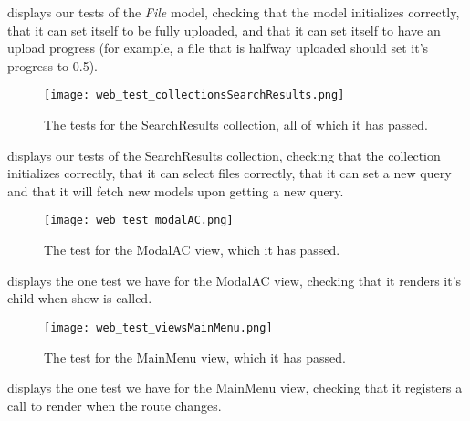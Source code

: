  displays our tests of the \textit{File} model, checking that the model initializes correctly, that it can set itself to be fully uploaded, and that it can set itself to have an upload progress (for example, a file that is halfway uploaded should set it’s progress to 0.5).
\begin{figure}[h]
\centering
\texttt{[image: web\_test\_collectionsSearchResults.png]}
\caption{The tests for the SearchResults collection, all of which it has passed.}
\label{fig:web_test_collectionsSearchResults}
\end{figure}

 displays our tests of the SearchResults collection, checking that the collection initializes correctly, that it can select files correctly, that it can set a new query and that it will fetch new models upon getting a new query.
\begin{figure}[h]
\centering
\texttt{[image: web\_test\_modalAC.png]}
\caption{The test for the ModalAC view, which it has passed.}
\label{fig:web_test_modalAC}
\end{figure}

 displays the one test we have for the ModalAC view, checking that it renders it’s child when show is called.
\begin{figure}[h]
\centering
\texttt{[image: web\_test\_viewsMainMenu.png]}
\caption{The test for the MainMenu view, which it has passed.}
\label{fig:web_test_viewsMainMenu}
\end{figure}

 displays the one test we have for the MainMenu view, checking that it registers a call to render when the route changes.